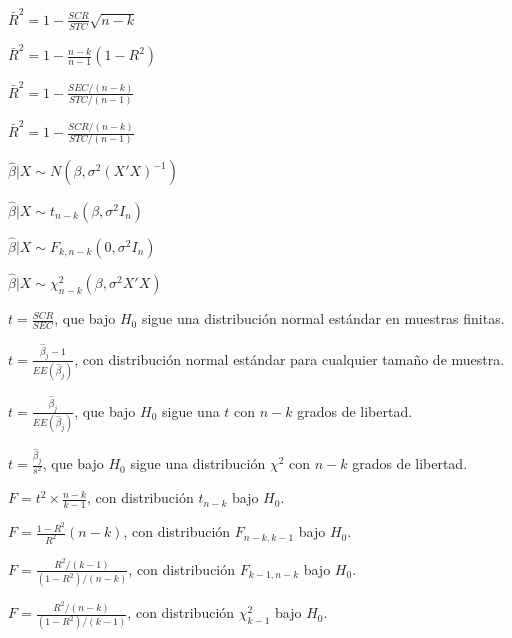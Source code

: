 \begin{opts}
    \item $\bar{R}^2 = 1 - \frac{SCR}{STC} \sqrt{n - k}$
    \item $\bar{R}^2 = 1 - \frac{n - k}{n - 1} (1 - R^2)$
    \item $\bar{R}^2 = 1 - \frac{SEC / (n - k)}{STC / (n - 1)}$
    \item $\bar{R}^2 = 1 - \frac{SCR / (n - k)}{STC / (n - 1)}$
\end{opts}

\begin{opts}
    \item $\hat{\beta}|X \sim N(\beta, \sigma^2 (X'X)^{-1})$
    \item $\hat{\beta}|X \sim t_{n-k}(\beta, \sigma^2 I_n)$
    \item $\hat{\beta}|X \sim F_{k, n-k}(0, \sigma^2 I_n)$
    \item $\hat{\beta}|X \sim \chi^2_{n-k}(\beta, \sigma^2 X'X)$
\end{opts}

\begin{opts}
    \item $t = \frac{SCR}{SEC}$, que bajo $H_0$ sigue una distribución normal estándar en muestras finitas.
    \item $t = \frac{\hat{\beta}_j - 1}{EE(\hat{\beta}_j)}$, con distribución normal estándar para cualquier tamaño de muestra.
    \item $t = \frac{\hat{\beta}_j}{EE(\hat{\beta}_j)}$, que bajo $H_0$ sigue una $t$ con $n - k$ grados de libertad.
    \item $t = \frac{\hat{\beta}_j}{s^2}$, que bajo $H_0$ sigue una distribución $\chi^2$ con $n - k$ grados de libertad.
\end{opts}

\begin{opts}
    \item $F = t^2 \times \frac{n - k}{k - 1}$, con distribución $t_{n-k}$ bajo $H_0$.
    \item $F = \frac{1 - R^2}{R^2} (n - k)$, con distribución $F_{n-k, k-1}$ bajo $H_0$.
    \item $F = \frac{R^2 / (k - 1)}{(1 - R^2) / (n - k)}$, con distribución $F_{k-1, n-k}$ bajo $H_0$.
    \item $F = \frac{R^2 / (n - k)}{(1 - R^2) / (k - 1)}$, con distribución $\chi^2_{k-1}$ bajo $H_0$.
\end{opts}

